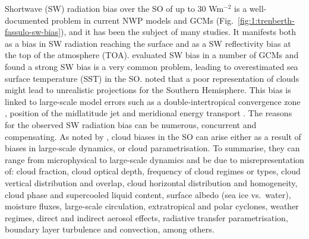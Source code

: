 Shortwave (SW) radiation bias over the SO of up to 30 Wm$^{-2}$ is a
well-documented problem in current NWP models and GCMs
\citep{trenberth2010} (Fig.\ \ref{fig:1:trenberth-fassulo-sw-bias}),
and it has been the subject of many studies.
It manifests both as a bias in SW radiation reaching the surface and as a
SW reflectivity bias at the top of the atmosphere (TOA).
\cite{bodas-salcedo2014} evaluated SW bias in a number
of GCMs and found a strong SW bias is a very common problem, leading to
overestimated sea surface temperature (SST) in the SO.
\cite{trenberth2010} noted that a poor representation of clouds might lead to
unrealistic projections for the Southern Hemisphere. This bias is linked to
large-scale model errors such as a double-intertropical
convergence zone \citep{hwang2013}, position of the midlatitude jet and
meridional energy transport \citep{mason2014}.
The reasons for the observed SW radiation bias
can be numerous, concurrent and compensating.
As noted by \cite{kelleher2019}, cloud biases in the SO can arise either
as a result of biases in large-scale dynamics, or cloud parametrisation.
To summarise, they can range
from microphysical to large-scale dynamics and be due to misrepresentation of:
cloud fraction, cloud optical depth, frequency of cloud regimes or types,
cloud vertical distribution and overlap, cloud horizontal distribution
and homogeneity, cloud phase and supercooled liquid content, surface albedo
(sea ice vs.~water), moisture fluxes, large-scale circulation, extratropical
and polar cyclones, weather regimes, direct and indirect aerosol effects,
radiative transfer parametrisation, boundary layer turbulence and convection,
among others.

